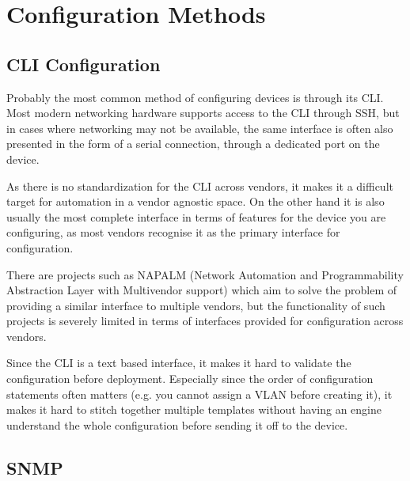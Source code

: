 


\section{Configuration Methods}

\subsection{CLI Configuration}

Probably the most common method of configuring devices is through its \acrlong{CLI}. 
Most modern networking hardware supports access to the \acrshort{CLI} through SSH,
but in cases where networking may not be available, the same interface is often also
presented in the form of a serial connection, through a dedicated port on the device.

As there is no standardization for the \acrshort{CLI} across vendors, it makes it a
difficult target for automation in a vendor agnostic space. On the other hand it
is also usually the most complete interface in terms of features for the device
you are configuring, as most vendors recognise it as the primary interface for configuration\cite{noauthor_configuration_nodate}.

There are projects such as NAPALM (Network Automation and Programmability Abstraction Layer with Multivendor support)\cite{noauthor_napalm_nodate}
which aim to solve the problem of providing a similar interface to multiple vendors,
but the functionality of such projects is severely limited in terms of interfaces provided
for configuration across vendors.

Since the \acrshort{CLI} is a text based interface, it makes it hard to validate the configuration
before deployment. Especially since the order of configuration statements often matters
(e.g. you cannot assign a VLAN before creating it), it makes it hard to stitch together
multiple templates without having an engine understand the whole configuration before sending
it off to the device.

\subsection{SNMP}

